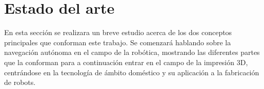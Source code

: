 \chapter{Estado del arte}
\label{estado del arte}

En esta sección se realizara un breve estudio acerca de los dos conceptos principales que conforman este trabajo. Se comenzará hablando sobre la navegación autónoma en el campo de la robótica, mostrando las diferentes partes que la conforman para a continuación entrar en el campo de la impresión 3D, centrándose en la tecnología de ámbito doméstico y su aplicación a la fabricación de robots.


